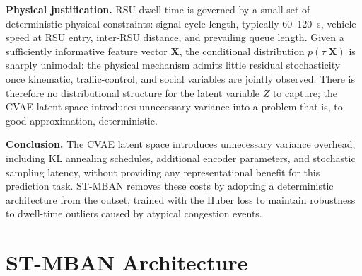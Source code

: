 \documentclass[journal]{IEEEtran}
\begin{document}
\textbf{Physical justification.}
RSU dwell time is governed by a small set of deterministic physical constraints: signal cycle length, typically 60--120~s, vehicle speed at RSU entry, inter-RSU distance, and prevailing queue length.
Given a sufficiently informative feature vector $\mathbf{X}$, the conditional distribution $p(\tau | \mathbf{X})$ is sharply unimodal: the physical mechanism admits little residual stochasticity once kinematic, traffic-control, and social variables are jointly observed.
There is therefore no distributional structure for the latent variable $Z$ to capture; the CVAE latent space introduces unnecessary variance into a problem that is, to good approximation, deterministic.

\textbf{Conclusion.}
The CVAE latent space introduces unnecessary variance overhead, including KL annealing schedules, additional encoder parameters, and stochastic sampling latency, without providing any representational benefit for this prediction task.
ST-MBAN removes these costs by adopting a deterministic architecture from the outset, trained with the Huber loss to maintain robustness to dwell-time outliers caused by atypical congestion events.


\section{ST-MBAN Architecture} \label{sec:architecture}

\end{document}
